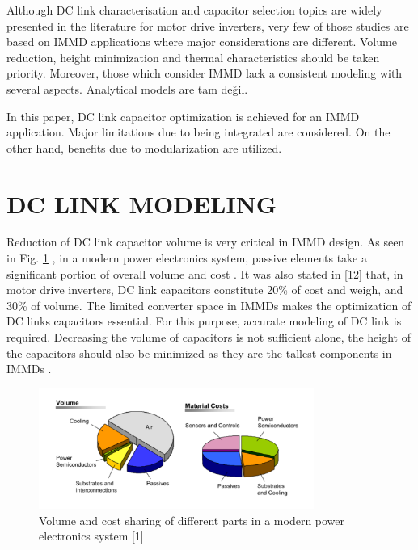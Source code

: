 \documentclass[conference,a4paper,twocolumn]{IEEEtran}
\begin{document}
Although DC link characterisation and capacitor selection topics are widely presented in the literature for motor drive inverters, very few of those studies are based on IMMD applications where major considerations are different. Volume reduction, height minimization and thermal characteristics should be taken priority. Moreover, those which consider IMMD lack a consistent modeling with several aspects. Analytical models are tam değil.

In this paper, DC link capacitor optimization is achieved for an IMMD application. Major limitations due to being integrated are considered. On the other hand, benefits due to modularization are utilized.


\cite{Engelmann2015}


\cite{Basler2015}





\section{DC LINK MODELING}


Reduction of DC link capacitor volume is very critical in IMMD design. As seen in Fig. \ref{fig2} , in a modern power electronics system, passive elements take a significant portion of overall volume and cost \cite{LoCalzo2016}. It was also stated in [12] that, in motor drive inverters, DC link capacitors constitute 20\% of cost and weigh, and 30\% of volume. The limited converter space in IMMDs makes the optimization of DC links capacitors essential. For this purpose, accurate modeling of DC link is required. Decreasing the volume of capacitors is not sufficient alone, the height of the capacitors should also be minimized as they are the tallest components in IMMDs \cite{Wang2013,Wang2015}.

\begin{figure}[h]
  \centering
  \includegraphics[width=9cm]{fig2}
  \caption{Volume and cost sharing of different parts in a modern power electronics system [1]}
  \label{fig2}
\end{figure}
\end{document}

